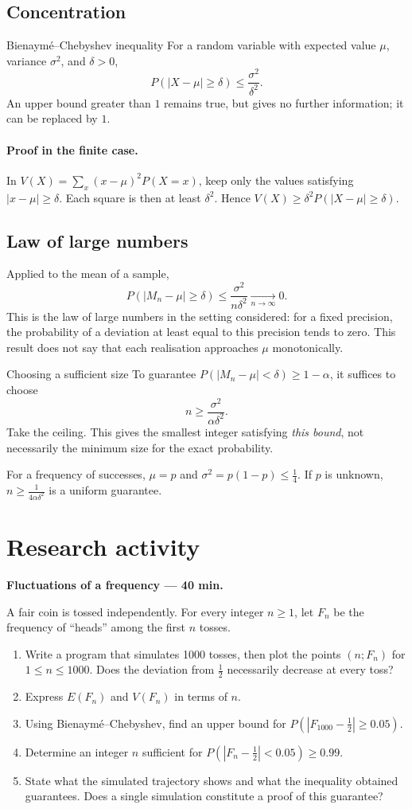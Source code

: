 \subsection{Concentration}
\begin{retenir}{Bienaymé--Chebyshev inequality}
For a random variable with expected value $\mu$, variance $\sigma^2$, and $\delta>0$,
\[P(|X-\mu|\ge\delta)\le\frac{\sigma^2}{\delta^2}.\]
An upper bound greater than $1$ remains true, but gives no further information; it can be replaced by $1$.
\end{retenir}
\paragraph{Proof in the finite case.} In $V(X)=\sum_x(x-\mu)^2P(X=x)$, keep only the values satisfying $|x-\mu|\ge\delta$. Each square is then at least $\delta^2$. Hence $V(X)\ge\delta^2P(|X-\mu|\ge\delta)$.
\subsection{Law of large numbers}
Applied to the mean of a sample,
\[P(|M_n-\mu|\ge\delta)\le\frac{\sigma^2}{n\delta^2}\xrightarrow[n\to\infty]{}0.\]
This is the law of large numbers in the setting considered: for a fixed precision, the probability of a deviation at least equal to this precision tends to zero. This result does not say that each realisation approaches $\mu$ monotonically.
\begin{methode}{Choosing a sufficient size}
To guarantee $P(|M_n-\mu|<\delta)\ge1-\alpha$, it suffices to choose
\[n\ge\frac{\sigma^2}{\alpha\delta^2}.\]
Take the ceiling. This gives the smallest integer satisfying \emph{this bound}, not necessarily the minimum size for the exact probability.
\end{methode}
For a frequency of successes, $\mu=p$ and $\sigma^2=p(1-p)\le\frac{1}{4}$. If $p$ is unknown, $n\ge\frac{1}{4\alpha\delta^2}$ is a uniform guarantee.


\section{Research activity}\textbf{Fluctuations of a frequency --- 40 min.}\par A fair coin is tossed independently. For every integer $n\ge1$, let $F_n$ be the frequency of ``heads'' among the first $n$ tosses.
\begin{enumerate}\item Write a program that simulates 1000 tosses, then plot the points $(n;F_n)$ for $1\le n\le1000$. Does the deviation from $\frac12$ necessarily decrease at every toss?
\item Express $E(F_n)$ and $V(F_n)$ in terms of $n$.
\item Using Bienaymé--Chebyshev, find an upper bound for $P(|F_{1000}-\frac12|\ge0.05)$.
\item Determine an integer $n$ sufficient for $P(|F_n-\frac12|<0.05)\ge0.99$.
\item State what the simulated trajectory shows and what the inequality obtained guarantees. Does a single simulation constitute a proof of this guarantee?\end{enumerate}


